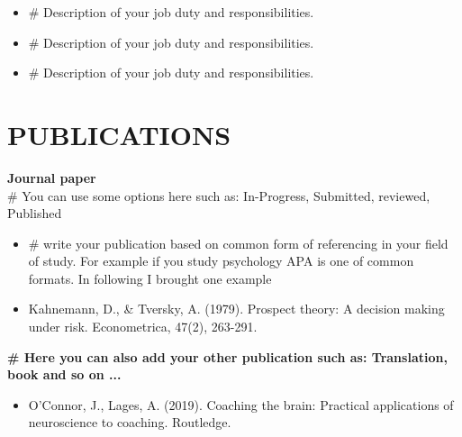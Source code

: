 \documentclass[a4paper,9pt]{extarticle}
\begin{document}
    \begin{itemize}
        \item \# Description of your job duty and responsibilities.
        \item \# Description of your job duty and responsibilities.
        \item \# Description of your job duty and responsibilities.
    \end{itemize}

    \section*{PUBLICATIONS}
    \noindent
    \textbf{Journal paper}\\
    \textup{\# You can use some options here such as: In-Progress, Submitted, reviewed, Published}%
    \begin{itemize}
        \item \# write your publication based on common form of referencing in your field of study. For example if you study psychology APA is one of common formats. In following I brought one example
        \item Kahnemann, D., \& Tversky, A. (1979). Prospect theory: A decision making under risk. Econometrica, 47(2), 263-291.
    \end{itemize}
    \noindent
    \textbf{\# Here you can also add your other publication such as: Translation, book and so on ...}
    \begin{itemize}
        \item O'Connor, J., Lages, A. (2019). Coaching the brain: Practical applications of neuroscience to coaching. Routledge.
    \end{itemize}
\end{document}
